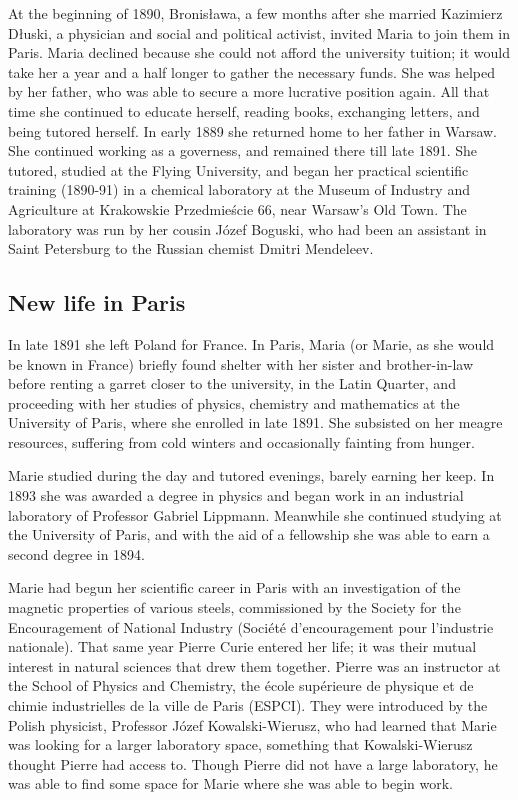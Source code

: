 \documentclass[12pt,a4paper]{article}
\begin{document}
At the beginning of 1890, Bronis\l{}awa, a few months after she married Kazimierz D\l{}uski, a physician and social and political activist, invited Maria to join them in Paris. Maria declined because she could not afford the university tuition; it would take her a year and a half longer to gather the necessary funds. She was helped by her father, who was able to secure a more lucrative position again. All that time she continued to educate herself, reading books, exchanging letters, and being tutored herself. In early 1889 she returned home to her father in Warsaw. She continued working as a governess, and remained there till late 1891. She tutored, studied at the Flying University, and began her practical scientific training (1890-91) in a chemical laboratory at the Museum of Industry and Agriculture at Krakowskie Przedmie\'scie 66, near Warsaw's Old Town. The laboratory was run by her cousin J\'ozef Boguski, who had been an assistant in Saint Petersburg to the Russian chemist Dmitri Mendeleev.


\subsection{New life in Paris}

In late 1891 she left Poland for France. In Paris, Maria (or Marie, as she would be known in France) briefly found shelter with her sister and brother-in-law before renting a garret closer to the university, in the Latin Quarter, and proceeding with her studies of physics, chemistry and mathematics at the University of Paris, where she enrolled in late 1891. She subsisted on her meagre resources, suffering from cold winters and occasionally fainting from hunger.

Marie studied during the day and tutored evenings, barely earning her keep. In 1893 she was awarded a degree in physics and began work in an industrial laboratory of Professor Gabriel Lippmann. Meanwhile she continued studying at the University of Paris, and with the aid of a fellowship she was able to earn a second degree in 1894.

Marie had begun her scientific career in Paris with an investigation of the magnetic properties of various steels, commissioned by the Society for the Encouragement of National Industry (Soci\'et\'e d'encouragement pour l'industrie nationale). That same year Pierre Curie entered her life; it was their mutual interest in natural sciences that drew them together. Pierre was an instructor at the School of Physics and Chemistry, the \'ecole sup\'erieure de physique et de chimie industrielles de la ville de Paris (ESPCI). They were introduced by the Polish physicist, Professor J\'ozef Kowalski-Wierusz, who had learned that Marie was looking for a larger laboratory space, something that Kowalski-Wierusz thought Pierre had access to. Though Pierre did not have a large laboratory, he was able to find some space for Marie where she was able to begin work.
\end{document}
